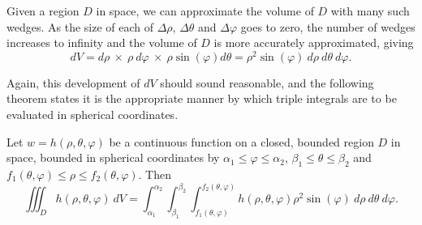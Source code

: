 Given a region $D$ in space, we can approximate the volume of $D$ with many such wedges. As the size of each of $\Delta\rho$, $\Delta\theta$ and $\Delta\varphi$ goes to zero, the number of wedges increases to infinity and the volume of $D$ is more accurately approximated, giving
\[
dV = d\rho\ \times\ \rho\ d\varphi\ \times\ \rho\sin(\varphi)d\theta = \rho^2\sin(\varphi)\ d\rho\ d\theta\ d\varphi.
\]

Again, this development of $dV$ should sound reasonable, and the following theorem states it is the appropriate manner by which triple integrals are to be evaluated in spherical coordinates.


\begin{theorem}\label{thm:triple_int_spherical}
Let $w=h(\rho,\theta,\varphi)$ be a continuous function on a closed, bounded region $D$ in space, bounded in spherical coordinates by $\alpha_1 \leq \varphi \leq \alpha_2$, $\beta_1 \leq \theta \leq \beta_2$ and $f_1(\theta,\varphi) \leq \rho \leq f_2(\theta,\varphi)$. Then 
\[
\iiint_D h(\rho,\theta,\varphi)\ dV = \int_{\alpha_1}^{\alpha_2}\int_{\beta_1}^{\beta_2}\int_{f_1(\theta,\varphi)}^{f_2(\theta,\varphi)} h(\rho,\theta,\varphi) \rho^2\sin(\varphi)\ d\rho\ d\theta\ d\varphi.
\]
\end{theorem}

